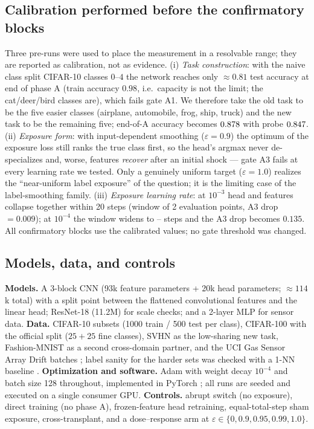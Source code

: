 \documentclass[review,12pt]{elsarticle}
\begin{document}
\subsection{Calibration performed before the confirmatory blocks}
\label{sec:calibration}
Three pre-runs were used to place the measurement in a resolvable range; they
are reported as calibration, not as evidence.
(i) \emph{Task construction}: with the naive class split CIFAR-10 classes
$0$--$4$ the network reaches only $\approx0.81$ test accuracy at end of phase A
(train accuracy $0.98$, i.e.\ capacity is not the limit; the cat/deer/bird
classes are), which fails gate A1. We therefore take the old task to be the
five easier classes (airplane, automobile, frog, ship, truck) and the new task
to be the remaining five; end-of-A accuracy becomes $0.878$ with probe
$0.847$.
(ii) \emph{Exposure form}: with input-dependent smoothing
($\varepsilon=0.9$) the optimum of the exposure loss still ranks the true class
first, so the head's argmax never de-specializes and, worse, features
\emph{recover} after an initial shock --- gate A3 fails at every learning rate
we tested. Only a genuinely uniform target ($\varepsilon=1.0$) realizes the
``near-uniform label exposure'' of the question; it is the limiting case of the
label-smoothing family.
(iii) \emph{Exposure learning rate}: at $10^{-3}$ head and features collapse
together within 20 steps (window of 2 evaluation points, A3 drop $=0.009$); at
$10^{-4}$ the window widens to \CalWinFirst--\CalWinLast{} steps and the A3 drop
becomes $0.135$. All confirmatory blocks use the calibrated values; no gate
threshold was changed.

\subsection{Models, data, and controls}
\label{sec:setup}
\textbf{Models.} A 3-block CNN (93k feature parameters + 20k head parameters;
$\approx114$k total) with a split point between the flattened convolutional
features and the linear head; ResNet-18 \cite{he2016deep} (11.2M) for scale
checks; and a 2-layer MLP for sensor data. \textbf{Data.} CIFAR-10
\cite{krizhevsky2009learning} subsets (1000 train / 500 test per class),
CIFAR-100 \cite{krizhevsky2009learning} with the official split ($25{+}25$
fine classes), SVHN \cite{netzer2011reading} as the low-sharing new task,
Fashion-MNIST \cite{xiao2017fashion} as a second cross-domain partner, and the
UCI Gas Sensor Array Drift batches \cite{gasdrift}; label sanity for the harder
sets was checked with a 1-NN baseline \cite{pedregosa2011scikit}.
\textbf{Optimization and software.} Adam \cite{kingma2015adam} with weight
decay $10^{-4}$ and batch size 128 throughout, implemented in PyTorch
\cite{paszke2019pytorch}; all runs are seeded and executed on a single
consumer GPU. \textbf{Controls.} abrupt switch (no exposure),
direct training (no phase A), frozen-feature head retraining, equal-total-step
sham exposure, cross-transplant, and a dose--response arm at
$\varepsilon\in\{0,0.9,0.95,0.99,1.0\}$.
\end{document}
